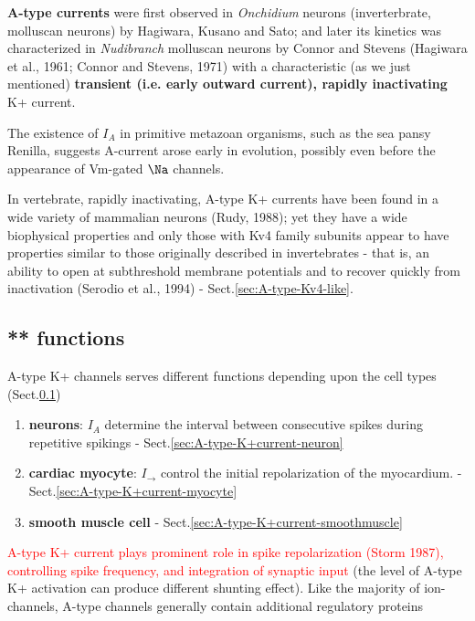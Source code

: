 \begin{mdframed}

{\bf A-type currents} were first observed in {\it Onchidium} neurons
(inverterbrate, molluscan neurons) by Hagiwara, Kusano and Sato; and later its
kinetics was characterized in {\it Nudibranch} molluscan neurons by Connor and
Stevens (Hagiwara et al., 1961; Connor and Stevens, 1971) with a characteristic
(as we just mentioned) {\bf transient (i.e. early outward current), rapidly
inactivating} K+ current.

The existence of $I_A$ in primitive metazoan organisms, such as the sea
pansy Renilla, suggests A-current arose early in evolution, possibly even before
the appearance of Vm-gated $\Na$ channels.

\end{mdframed}

In vertebrate, rapidly inactivating, A-type K+ currents have been found in a
wide variety of mammalian neurons (Rudy, 1988); yet they have a wide biophysical
properties and only those with Kv4 family subunits appear to have properties
similar to those originally described in invertebrates - that is, an ability to
open at subthreshold membrane potentials and to recover quickly from
inactivation (Serodio et al., 1994) - Sect.\ref{sec:A-type-Kv4-like}.



\subsection{** functions}
\label{sec:A-type-K+current-function}

A-type K+ channels serves different functions depending upon the cell types 
(Sect.\ref{sec:A-type-K+current-function})

\begin{enumerate}
  \item {\bf neurons}: $I_A$ determine the interval between consecutive spikes
  during repetitive spikings - Sect.\ref{sec:A-type-K+current-neuron}
  
  \item {\bf cardiac myocyte}: $I_\to$ control the initial repolarization of the
  myocardium. - Sect.\ref{sec:A-type-K+current-myocyte}

  \item {\bf smooth muscle cell} - Sect.\ref{sec:A-type-K+current-smoothmuscle}
\end{enumerate}

\textcolor{red}{A-type K+ current plays prominent role in spike repolarization
(Storm 1987), controlling spike frequency, and integration of synaptic input}
(the level of A-type K+ activation can produce different shunting effect).
Like the majority of ion-channels, A-type channels generally contain additional
regulatory proteins
 
